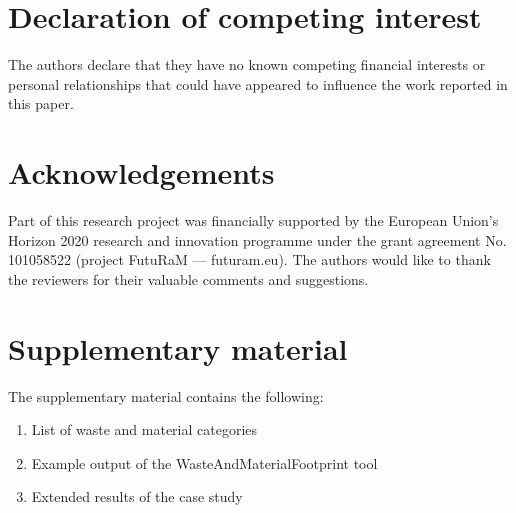 \documentclass[review,3p,authoryear]{elsarticle}
\begin{document}
\section*{Declaration of competing interest}
The authors declare that they have no known competing financial interests or personal relationships that could have appeared to influence the work reported in this paper.

\section*{Acknowledgements}
    Part of this research project was financially supported by the European Union's Horizon 2020 research and innovation programme under the grant agreement No. 101058522 (project FutuRaM --- futuram.eu). The authors would like to thank the reviewers for their valuable comments and suggestions.

\section*{Supplementary material}
    The supplementary material contains the following:
    \begin{enumerate}
        \item List of waste and material categories
        \item Example output of the WasteAndMaterialFootprint tool
        \item Extended results of the case study
    \end{enumerate}



    


\end{document}
